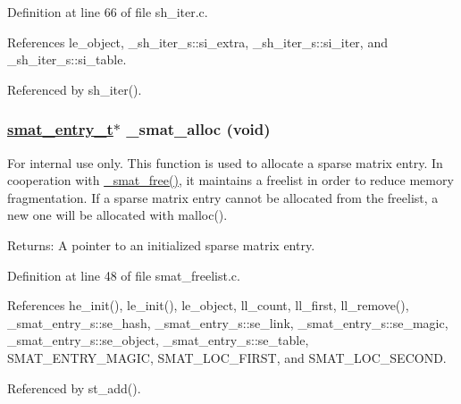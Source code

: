 Definition at line 66 of file sh\_\-iter.c.

References le\_\-object, \_\-sh\_\-iter\_\-s::si\_\-extra, \_\-sh\_\-iter\_\-s::si\_\-iter, and \_\-sh\_\-iter\_\-s::si\_\-table.

Referenced by sh\_\-iter().\hypertarget{group__dbprim__smat_ga25}{
\subsubsection[\_\-smat\_\-alloc]{\setlength{\rightskip}{0pt plus 5cm}\hyperlink{struct__smat__entry__s}{smat\_\-entry\_\-t}$\ast$ \_\-smat\_\-alloc (void)}}
\label{group__dbprim__smat_ga25}


\begin{Desc}
\item[For internal use only.]
This function is used to allocate a sparse matrix entry. In cooperation with \hyperlink{group__dbprim__smat_ga26}{\_\-smat\_\-free()}, it maintains a freelist in order to reduce memory fragmentation. If a sparse matrix entry cannot be allocated from the freelist, a new one will be allocated with malloc().

\begin{Desc}
\item[Returns:]A pointer to an initialized sparse matrix entry.\end{Desc}
\end{Desc}


Definition at line 48 of file smat\_\-freelist.c.

References he\_\-init(), le\_\-init(), le\_\-object, ll\_\-count, ll\_\-first, ll\_\-remove(), \_\-smat\_\-entry\_\-s::se\_\-hash, \_\-smat\_\-entry\_\-s::se\_\-link, \_\-smat\_\-entry\_\-s::se\_\-magic, \_\-smat\_\-entry\_\-s::se\_\-object, \_\-smat\_\-entry\_\-s::se\_\-table, SMAT\_\-ENTRY\_\-MAGIC, SMAT\_\-LOC\_\-FIRST, and SMAT\_\-LOC\_\-SECOND.

Referenced by st\_\-add().

